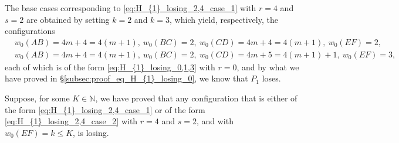 \documentclass[11pt,reqno]{amsart}
\theoremstyle{definition}
\theoremstyle{definition}
\begin{document}
The base cases corresponding to \eqref{eq:H_{1}_losing_2,4_case_1} with $r=4$ and $s=2$ are obtained by setting $k=2$ and $k=3$, which yield, respectively, the configurations
\begin{align}
{}&w_{0}(AB)=4m+4=4(m+1),\ w_{0}(BC)=2,\ w_{0}(CD)=4m+4=4(m+1),\ w_{0}(EF)=2,\nonumber\\
{}&w_{0}(AB)=4m+4=4(m+1),\ w_{0}(BC)=2,\ w_{0}(CD)=4m+5=4(m+1)+1,\ w_{0}(EF)=3,\nonumber
\end{align}
each of which is of the form \eqref{eq:H_{1}_losing_0,1,3} with $r=0$, and by what we have proved in \S\ref{subsec:proof_eq_H_{1}_losing_0}, we know that $P_{1}$ loses. 

Suppose, for some $K \in \mathbb{N}$, we have proved that any configuration that is either of the form \eqref{eq:H_{1}_losing_2,4_case_1} or of the form \eqref{eq:H_{1}_losing_2,4_case_2} with $r=4$ and $s=2$, and with $w_{0}(EF)=k\leqslant K$, is losing.
\end{document}
